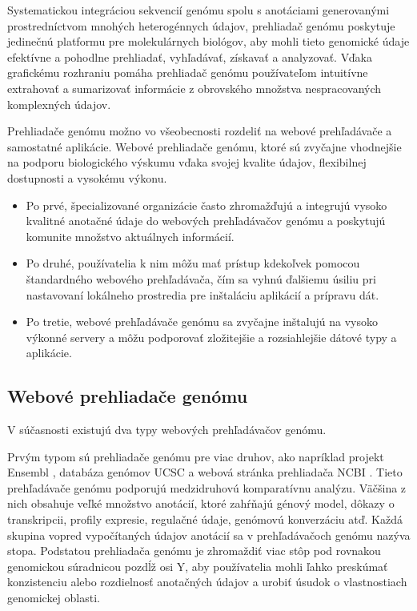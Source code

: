 Systematickou integráciou sekvencií genómu spolu s anotáciami generovanými prostredníctvom mnohých heterogénnych údajov, prehliadač genómu poskytuje jedinečnú platformu pre molekulárnych biológov, aby mohli tieto genomické údaje efektívne a pohodlne prehliadať, vyhľadávať, získavať a analyzovať.
Vďaka grafickému rozhraniu pomáha prehliadač genómu používateľom intuitívne extrahovať a sumarizovať informácie z obrovského množstva nespracovaných komplexných údajov.

Prehliadače genómu možno vo všeobecnosti rozdeliť na webové prehľadávače a samostatné aplikácie.
Webové prehliadače genómu, ktoré sú zvyčajne vhodnejšie na podporu biologického výskumu vďaka svojej kvalite údajov, flexibilnej dostupnosti a vysokému výkonu.
\begin{itemize}
	\item Po prvé, špecializované organizácie často zhromažďujú a integrujú vysoko kvalitné anotačné údaje do webových prehľadávačov genómu a poskytujú komunite množstvo aktuálnych informácií. 
	\item Po druhé, používatelia k nim môžu mať prístup kdekoľvek pomocou štandardného webového prehľadávača, čím sa vyhnú ďalšiemu úsiliu pri nastavovaní lokálneho prostredia pre inštaláciu aplikácií a prípravu dát. 
	\item Po tretie, webové prehľadávače genómu sa zvyčajne inštalujú na vysoko výkonné servery a môžu podporovať zložitejšie a rozsiahlejšie dátové typy a aplikácie.
\end{itemize}

\subsection{Webové prehliadače genómu}

V súčasnosti existujú dva typy webových prehľadávačov genómu. 

Prvým typom sú prehliadače genómu pre viac druhov, ako napríklad projekt Ensembl \cite{ENSEMBLgb}, databáza genómov UCSC \cite{UCSCgb} a webová stránka prehliadača NCBI \cite{NCBIgb}.
Tieto prehľadávače genómu podporujú medzidruhovú komparatívnu analýzu.
Väčšina z nich obsahuje veľké množstvo anotácií, ktoré zahŕňajú génový model, dôkazy o transkripcii, profily expresie, regulačné údaje, genómovú konverzáciu atď.
Každá skupina vopred vypočítaných údajov anotácií sa v prehľadávačoch genómu nazýva stopa.
Podstatou prehliadača genómu je zhromaždiť viac stôp pod rovnakou genomickou súradnicou pozdĺž osi Y, aby používatelia mohli ľahko preskúmať konzistenciu alebo rozdielnosť anotačných údajov a urobiť úsudok o vlastnostiach genomickej oblasti.

